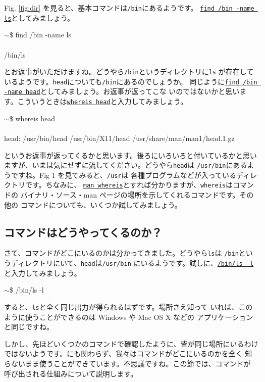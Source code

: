 \documentclass[a4j]{ltjsreport}
\begin{document}
    Fig. \ref{fig:dir} を見ると、基本コマンドは\verb+/bin+にあるようです。
    \underline{\texttt{find /bin -name ls}}としてみましょう。
    \begin{screen}
        $\sim$\$ find  /bin  -name  ls\\
        \\
        /bin/ls
    \end{screen}
    とお返事がいただけますね。どうやら\verb+/bin+というディレクトリに\verb+ls+
    が存在しているようです。\verb+head+についても\verb+/bin+にあるのでしょうか。
    同じように\underline{\texttt{find /bin -name head}}としてみましょう。お返事が返ってこな
    いのではないかと思います。こういうときは\underline{\texttt{whereis head}}と入力してみましょう。
    \begin{screen}
        $\sim$\$ whereis  head \\
        \\
        head: /usr/bin/head /usr/bin/X11/head /usr/share/man/man1/head.1.gz
    \end{screen}
    というお返事が返ってくるかと思います。後ろにいろいろと付いているかと思い
    ますが、いまは気にせずに流してください。どうやら\verb+head+は
    \verb+/usr/bin+にあるようですね。Fig 1 を見てみると、\verb+/usr+は
    各種プログラムなどが入っているディレクトリです。ちなみに、
    \underline{\texttt{man whereis}}とすれば分かりますが、\verb+whereis+はコマンドの
    バイナリ・ソース・man ページの場所を示してくれるコマンドです。その他の
    コマンドについても、いくつか試してみましょう。

    \subsection{コマンドはどうやってくるのか？}
    さて、コマンドがどこにいるのかは分かってきました。どうやら\verb+ls+は
    \verb+/bin+というディレクトリにいて、\verb+head+は\verb+/usr/bin+
    にいるようです。試しに、\underline{\texttt{/bin/ls -l}}と入力してみましょう。
    \begin{screen}
        $\sim$\$ /bin/ls  -l 
    \end{screen}

    すると、\verb+ls+と全く同じ出力が得られるはずです。場所さえ知って
    いれば、このように使うことができるのは Windows や Mac OS X などの
    アプリケーションと同じですね。

    しかし、先ほどいくつかのコマンドで確認したように、皆が同じ場所にいるわけ
    ではないようです。にも関わらず、我々はコマンドがどこにいるのかを全く
    知らないまま使うことができています。不思議ですね。この節では、コマンドが
    呼び出される仕組みについて説明します。
\end{document}
